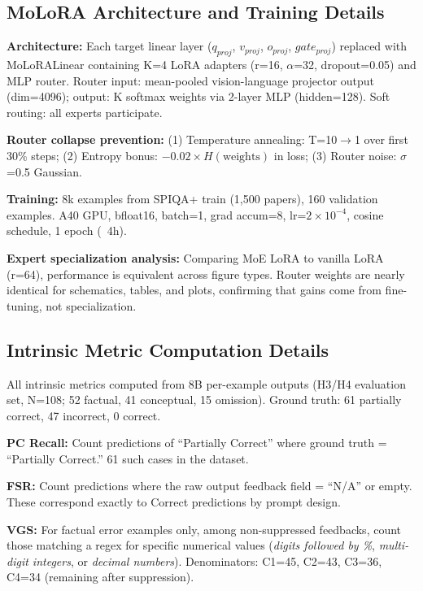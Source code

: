 \documentclass{article}
\begin{document}
\subsection{MoLoRA Architecture and Training Details}
\label{app:molora}

\textbf{Architecture:} Each target linear layer ($q_{proj}$, $v_{proj}$, $o_{proj}$, $gate_{proj}$)
replaced with MoLoRALinear containing K=4 LoRA adapters (r=16, $\alpha$=32, dropout=0.05) and
MLP router. Router input: mean-pooled vision-language projector output (dim=4096); output: K
softmax weights via 2-layer MLP (hidden=128). Soft routing: all experts participate.

\textbf{Router collapse prevention:} (1) Temperature annealing: T=10$\to$1 over first 30\% steps;
(2) Entropy bonus: $-0.02 \times H(\text{weights})$ in loss; (3) Router noise: $\sigma$=0.5 Gaussian.

\textbf{Training:} 8k examples from SPIQA+ train (1,500 papers), 160 validation examples.
A40 GPU, bfloat16, batch=1, grad accum=8, lr=$2{\times}10^{-4}$, cosine schedule, 1 epoch (~4h).

\textbf{Expert specialization analysis:} Comparing MoE LoRA to vanilla LoRA (r=64), performance
is equivalent across figure types. Router weights are nearly identical for schematics, tables,
and plots, confirming that gains come from fine-tuning, not specialization.

\subsection{Intrinsic Metric Computation Details}
\label{app:computation}

All intrinsic metrics computed from 8B per-example outputs (H3/H4 evaluation set,
N=108; 52 factual, 41 conceptual, 15 omission). Ground truth: 61 partially correct,
47 incorrect, 0 correct.

\textbf{PC Recall:} Count predictions of ``Partially Correct'' where ground truth =
``Partially Correct.'' 61 such cases in the dataset.

\textbf{FSR:} Count predictions where the raw output feedback field = ``N/A'' or
empty. These correspond exactly to Correct predictions by prompt design.

\textbf{VGS:} For factual error examples only, among non-suppressed feedbacks, count
those matching a regex for specific numerical values (\textit{digits followed by \%},
\textit{multi-digit integers}, or \textit{decimal numbers}). Denominators: C1=45,
C2=43, C3=36, C4=34 (remaining after suppression).
\end{document}
